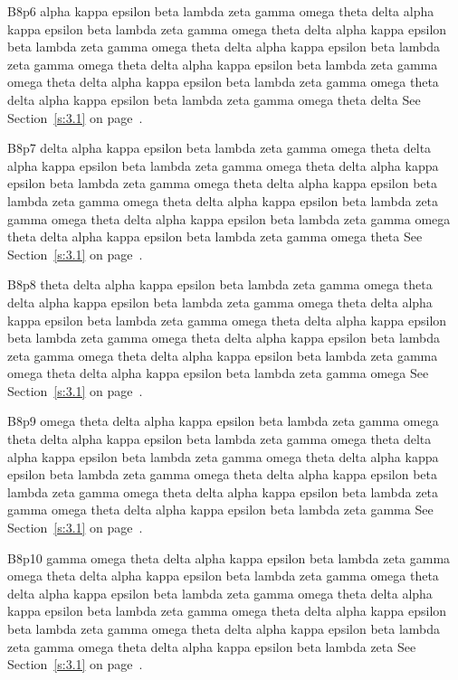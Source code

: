 B8p6 alpha kappa epsilon beta lambda zeta gamma omega theta delta alpha kappa epsilon beta lambda zeta gamma omega theta delta alpha kappa epsilon beta lambda zeta gamma omega theta delta alpha kappa epsilon beta lambda zeta gamma omega theta delta alpha kappa epsilon beta lambda zeta gamma omega theta delta alpha kappa epsilon beta lambda zeta gamma omega theta delta alpha kappa epsilon beta lambda zeta gamma omega theta delta See Section~\ref{s:3.1} on page~\pageref{s:3.1}.

B8p7 delta alpha kappa epsilon beta lambda zeta gamma omega theta delta alpha kappa epsilon beta lambda zeta gamma omega theta delta alpha kappa epsilon beta lambda zeta gamma omega theta delta alpha kappa epsilon beta lambda zeta gamma omega theta delta alpha kappa epsilon beta lambda zeta gamma omega theta delta alpha kappa epsilon beta lambda zeta gamma omega theta delta alpha kappa epsilon beta lambda zeta gamma omega theta See Section~\ref{s:3.1} on page~\pageref{s:3.1}.

B8p8 theta delta alpha kappa epsilon beta lambda zeta gamma omega theta delta alpha kappa epsilon beta lambda zeta gamma omega theta delta alpha kappa epsilon beta lambda zeta gamma omega theta delta alpha kappa epsilon beta lambda zeta gamma omega theta delta alpha kappa epsilon beta lambda zeta gamma omega theta delta alpha kappa epsilon beta lambda zeta gamma omega theta delta alpha kappa epsilon beta lambda zeta gamma omega See Section~\ref{s:3.1} on page~\pageref{s:3.1}.

B8p9 omega theta delta alpha kappa epsilon beta lambda zeta gamma omega theta delta alpha kappa epsilon beta lambda zeta gamma omega theta delta alpha kappa epsilon beta lambda zeta gamma omega theta delta alpha kappa epsilon beta lambda zeta gamma omega theta delta alpha kappa epsilon beta lambda zeta gamma omega theta delta alpha kappa epsilon beta lambda zeta gamma omega theta delta alpha kappa epsilon beta lambda zeta gamma See Section~\ref{s:3.1} on page~\pageref{s:3.1}.

B8p10 gamma omega theta delta alpha kappa epsilon beta lambda zeta gamma omega theta delta alpha kappa epsilon beta lambda zeta gamma omega theta delta alpha kappa epsilon beta lambda zeta gamma omega theta delta alpha kappa epsilon beta lambda zeta gamma omega theta delta alpha kappa epsilon beta lambda zeta gamma omega theta delta alpha kappa epsilon beta lambda zeta gamma omega theta delta alpha kappa epsilon beta lambda zeta See Section~\ref{s:3.1} on page~\pageref{s:3.1}.

